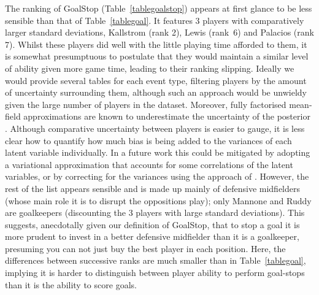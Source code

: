 \documentclass[11pt,a4paper]{article}
\begin{document}
The ranking of GoalStop (Table~\ref{tablegoalstop}) appears at first 
glance to be less sensible than that of Table~\ref{tablegoal}. It 
features 3 players with comparatively larger standard deviations, 
Kallstrom (rank 2), Lewis (rank~6) and Palacios (rank 7). Whilst these 
players did well with the little playing time afforded to them, it is 
somewhat presumptuous to postulate that they would maintain a similar 
level of ability given more game time, leading to their ranking slipping. 
Ideally we would provide several tables for each 
event type, filtering players by the amount of uncertainty surrounding 
them, although such an approach would be unwieldy given the large 
number of players in the dataset. Moreover, fully factorised mean-field 
approximations are known to underestimate the uncertainty of the 
posterior \citep{bishop_2006}. Although comparative uncertainty between 
players is easier to gauge, it is less clear how to quantify how much 
bias is being added to the variances of each latent variable 
individually. In a future work this could be mitigated by adopting a 
variational approximation that accounts for some correlations of the 
latent variables, or by correcting for the variances using the approach 
of \cite{giordano_2018}. However, the rest of the list appears sensible and is 
made up mainly of defensive midfielders (whose main role it is to 
disrupt the oppositions play); only Mannone and Ruddy are goalkeepers 
(discounting the 3 players with large standard deviations). This 
suggests, anecdotally given our definition of GoalStop, that to 
stop a goal it is more prudent to invest in a better 
defensive midfielder than it is a goalkeeper, presuming you can not 
just buy the best player in each position. Here, the differences 
between successive ranks are much smaller than in Table~\ref{tablegoal}, 
implying it is harder to distinguish between player ability to perform 
goal-stops than it is the ability to score goals. 
\end{document}
